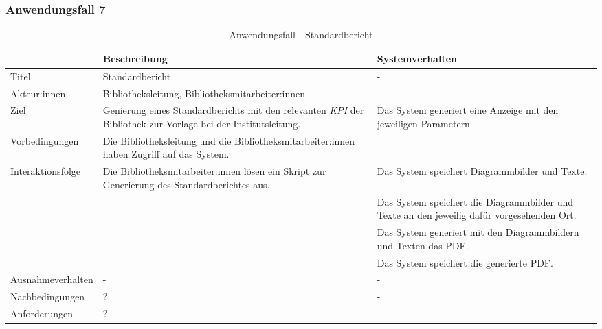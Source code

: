 \subsubsection{Anwendungsfall 7}

\begingroup
\setlength{\tabcolsep}{10pt} %
\renewcommand{\arraystretch}{1.25} 
\begin{table}[H]
    \centering
    \begin{adjustbox}{max width=\textwidth}
    \begin{tabular}{lp{7.0cm}p{7.0cm}}
       \toprule
       \textbf{}          & \textbf{Beschreibung} &\textbf{Systemverhalten}\\
       \midrule
        Titel                            &Standardbericht& -\\
        Akteur:innen                     &Bibliotheksleitung, Bibliotheksmitarbeiter:innen& -\\
        Ziel                             &Genierung eines Standardberichts mit den relevanten \textit{\acrshort{KPI}} der Bibliothek zur Vorlage bei der Institutsleitung. & Das System generiert eine Anzeige mit den jeweiligen Parametern\\
        Vorbedingungen                   &Die Bibliotheksleitung und die Bibliotheksmitarbeiter:innen haben Zugriff auf das System.& \\
        Interaktionsfolge                &Die Bibliotheksmitarbeiter:innen lösen ein Skript zur Generierung des Standardberichtes aus.& Das System speichert Diagrammbilder und Texte.\\
        &                                &Das System speichert die Diagrammbilder und Texte an den jeweilig dafür vorgesehenden Ort.\\
        &                                &Das System generiert mit den Diagrammbildern und Texten das PDF.\\
        &                                &Das System speichert die generierte PDF.\\
       
        Ausnahmeverhalten               &- & -\\
        Nachbedingungen                 &?& -\\

        Anforderungen                   &?& -\\
        \bottomrule
    \end{tabular}
    \end{adjustbox}
    \caption{%
    Anwendungsfall - Standardbericht   }
    \label{tab:AF_Standardbericht}
    \end{table}
\endgroup

